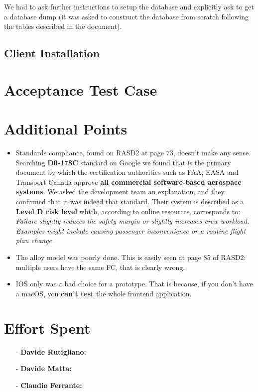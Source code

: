 \documentclass[a4paper]{article}
\begin{document}
We had to ask further instructions to setup the database and explicitly ask to get a database dump (it was asked to construct the database from scratch following the tables described in the document).\\

\subsection{Client Installation}

\newpage
\section{Acceptance Test Case}

\newpage
\section{Additional Points}
\begin{itemize}
    \item Standards compliance, found on RASD2 at page 73, doesn't make any sense. Searching \textbf{D0-178C} standard on Google we found that is the primary document by which the certification authorities such as FAA, EASA and Transport Canada approve \textbf{all commercial software-based aerospace systems}. We asked the development team an explanation, and they confirmed that it was indeed that standard.
    Their system is described as a \textbf{Level D risk level} which, according to online resources, corresponds to: \textit{Failure slightly reduces the safety margin or slightly increases crew workload. Examples might include causing passenger inconvenience or a routine flight plan change.}
    \item The alloy model was poorly done. This is easily seen at page 85 of RASD2: multiple users have the same FC, that is clearly wrong.
    \item IOS only was a bad choice for a prototype. That is because, if you don't have a macOS, you \textbf{can't test} the whole frontend application.
\end{itemize}

\newpage
\section{Effort Spent}
    \begin{itemize}
        \item[-] \textbf{Davide Rutigliano:}
        
        \item[-] \textbf{Davide Matta:}
        
        \item[-] \textbf{Claudio Ferrante:}
    \end{itemize}
\end{document}
